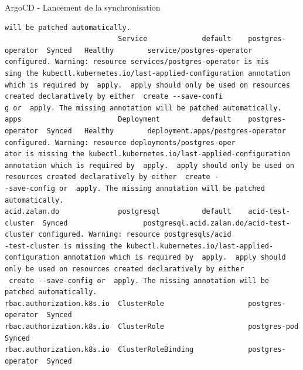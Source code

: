 \begin{frame}[fragile,shrink=1]{ArgoCD - Lancement de la synchronisation}
\begin{tiny}
\begin{Verbatim}[commandchars=\\\{\}]
 will be patched automatically.
                           Service             default    postgres-operator  Synced   Healthy        service/postgres-operator configured. Warning: resource services/postgres-operator is mis
sing the kubectl.kubernetes.io/last-applied-configuration annotation which is required by  apply.  apply should only be used on resources created declaratively by either  create --save-confi
g or  apply. The missing annotation will be patched automatically.
apps                       Deployment          default    postgres-operator  Synced   Healthy        deployment.apps/postgres-operator configured. Warning: resource deployments/postgres-oper
ator is missing the kubectl.kubernetes.io/last-applied-configuration annotation which is required by  apply.  apply should only be used on resources created declaratively by either  create -
-save-config or  apply. The missing annotation will be patched automatically.
acid.zalan.do              postgresql          default    acid-test-cluster  Synced                  postgresql.acid.zalan.do/acid-test-cluster configured. Warning: resource postgresqls/acid
-test-cluster is missing the kubectl.kubernetes.io/last-applied-configuration annotation which is required by  apply.  apply should only be used on resources created declaratively by either 
 create --save-config or  apply. The missing annotation will be patched automatically.
rbac.authorization.k8s.io  ClusterRole                    postgres-operator  Synced
rbac.authorization.k8s.io  ClusterRole                    postgres-pod       Synced                   
rbac.authorization.k8s.io  ClusterRoleBinding             postgres-operator  Synced
\end{Verbatim}
\end{tiny}

\end{frame}


